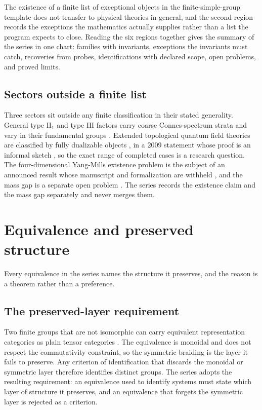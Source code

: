 \documentclass[11pt,letterpaper]{article}
\theoremstyle{definition}
\theoremstyle{remark}
\begin{document}
The existence of a finite list of exceptional objects in the finite-simple-group template does not transfer to physical theories in general, and the second region records the exceptions the mathematics actually supplies rather than a list the program expects to close. Reading the six regions together gives the summary of the series in one chart: families with invariants, exceptions the invariants must catch, recoveries from probes, identifications with declared scope, open problems, and proved limits.

\subsection{Sectors outside a finite list}

Three sectors sit outside any finite classification in their stated generality. General type $\mathrm{II}_1$ and type $\mathrm{III}$ factors carry coarse Connes-spectrum strata and vary in their fundamental groups \cite{corpus-8}. Extended topological quantum field theories are classified by fully dualizable objects \cite{corpus-34}, in a 2009 statement whose proof is an informal sketch \cite{corpus-35}, so the exact range of completed cases is a research question. The four-dimensional Yang-Mills existence problem is the subject of an announced result whose manuscript and formalization are withheld \cite{corpus-24,corpus-25}, and the mass gap is a separate open problem \cite{corpus-23}. The series records the existence claim and the mass gap separately and never merges them.

\section{Equivalence and preserved structure}

Every equivalence in the series names the structure it preserves, and the reason is a theorem rather than a preference.

\subsection{The preserved-layer requirement}

Two finite groups that are not isomorphic can carry equivalent representation categories as plain tensor categories \cite{corpus-74}. The equivalence is monoidal and does not respect the commutativity constraint, so the symmetric braiding is the layer it fails to preserve. Any criterion of identification that discards the monoidal or symmetric layer therefore identifies distinct groups. The series adopts the resulting requirement: an equivalence used to identify systems must state which layer of structure it preserves, and an equivalence that forgets the symmetric layer is rejected as a criterion.
\end{document}
